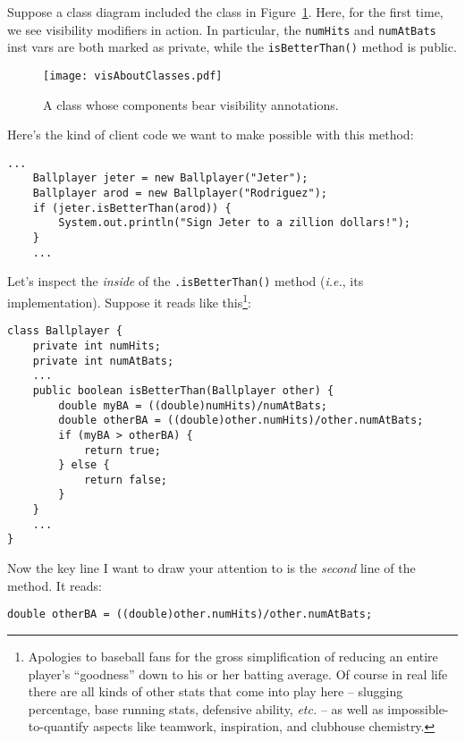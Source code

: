 Suppose a class diagram included the class in
Figure~\ref{fig:visAboutClasses}. Here, for the first time, we see visibility
modifiers in action. In particular, the \texttt{numHits} and
\texttt{numAtBats} inst vars are both marked as private, while the
\texttt{isBetterThan()} method is public.

\begin{figure}[h]
\centering
\bigskip
\texttt{[image: visAboutClasses.pdf]}
\smallskip
\caption{A class whose components bear visibility annotations.}
\label{fig:visAboutClasses}
\bigskip
\end{figure}

Here's the kind of client code we want to make possible with this method:

\begin{Verbatim}[fontsize=\footnotesize,samepage=true,frame=single]
    ...
    Ballplayer jeter = new Ballplayer("Jeter");
    Ballplayer arod = new Ballplayer("Rodriguez");
    if (jeter.isBetterThan(arod)) {
        System.out.println("Sign Jeter to a zillion dollars!");
    }
    ...
\end{Verbatim}

Let's inspect the \textit{inside} of the \texttt{.isBetterThan()} method
(\textit{i.e.}, its implementation). Suppose it reads like
this\footnote{Apologies to baseball fans for the gross simplification of
reducing an entire player's ``goodness'' down to his or her batting average. Of
course in real life there are all kinds of other stats that come into play
here -- slugging percentage, base running stats, defensive ability,
\textit{etc.} -- as well as impossible-to-quantify aspects like teamwork,
inspiration, and clubhouse chemistry.}:

\begin{Verbatim}[fontsize=\footnotesize,samepage=true,frame=single]
class Ballplayer {
    private int numHits;
    private int numAtBats;
    ...
    public boolean isBetterThan(Ballplayer other) {
        double myBA = ((double)numHits)/numAtBats;
        double otherBA = ((double)other.numHits)/other.numAtBats;
        if (myBA > otherBA) {
            return true;
        } else {
            return false;
        }
    }
    ...
}
\end{Verbatim}

Now the key line I want to draw your attention to is the \textit{second} line
of the method. It reads:

\begin{verbatim}
double otherBA = ((double)other.numHits)/other.numAtBats;
\end{verbatim}

